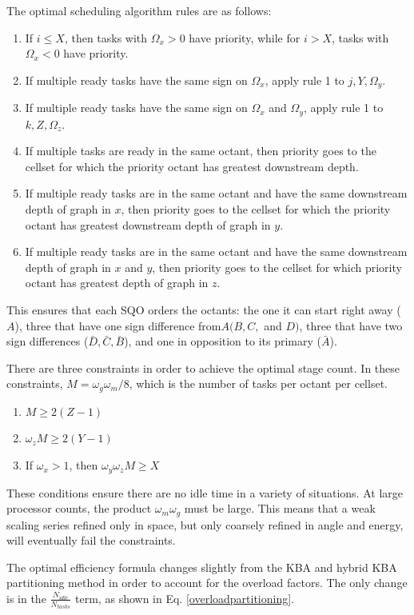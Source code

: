 \documentclass[11pt, letterpaper,titlepage,oneside]{article}
\begin{document}
The optimal scheduling algorithm rules are as follows:
\begin{enumerate}
\item If $i \leq X$, then tasks with $\Omega_x > 0$ have priority, while for $i > X$, tasks with $\Omega_x < 0$ have priority.
\item If multiple ready tasks have the same sign on $\Omega_x$, apply rule 1 to $j,Y,\Omega_y$.
\item If multiple ready tasks have the same sign on $\Omega_x$ and $\Omega_y$, apply rule 1 to $k,Z, \Omega_z$. 
\item If multiple tasks are ready in the same octant, then priority goes to the cellset for which the priority octant has greatest downstream depth.
\item If multiple ready tasks are in the same octant and have the same downstream depth of graph in $x$, then priority goes to the cellset for which the priority octant has greatest downstream depth of graph in $y$.
\item If multiple ready tasks are in the same octant and have the same downstream depth of graph in $x$ and $y$, then priority goes to the cellset for which priority octant has greatest depth of graph in $z$.
\end{enumerate}
This ensures that each SQO orders the octants: the one it can start right away ($A$), three that have one sign difference from$ A (B,C,$ and $D)$, three that have two sign differences ($\bar D, \bar C, \bar B$), and one in opposition to its primary ($\bar A$).

There are three constraints in order to achieve the optimal stage count. In these constraints, $M = \omega_g \omega_m/8$, which is the number of tasks per octant per cellset.

\begin{enumerate}
\item $ M \geq 2(Z-1)$
\item $\omega_z M \geq 2(Y-1)$
\item If $\omega_x > 1$, then $\omega_y \omega_z M \geq X$
\end{enumerate}

These conditions ensure there are no idle time in a variety of situations. At large processor counts, the product $\omega_m \omega_g$ must be large. This means that a weak scaling series refined only in space, but only coarsely refined in angle and energy, will eventually fail the constraints.

The optimal efficiency formula changes slightly from the KBA and hybrid KBA partitioning method in order to account for the overload factors. The only change is in the $\frac{N_{idle}}{N_{tasks}}$ term, as shown in Eq. \ref{overloadpartitioning}.
\end{document}
